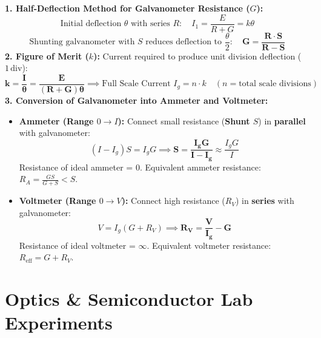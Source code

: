 \documentclass[10pt,a4paper]{article}
\begin{document}
\begin{formulabox}
\textbf{1. Half-Deflection Method for Galvanometer Resistance ($G$):}
\begin{equation}
  \text{Initial deflection } \theta \text{ with series } R: \quad I_1 = \frac{E}{R + G} = k\theta
\end{equation}
\begin{equation}
  \text{Shunting galvanometer with } S \text{ reduces deflection to } \frac{\theta}{2}: \quad \mathbf{G = \frac{R \cdot S}{R - S}}
\end{equation}
\textbf{2. Figure of Merit ($k$):} Current required to produce unit division deflection ($1\,\text{div}$):
\begin{equation}
  \mathbf{k = \frac{I}{\theta} = \frac{E}{(R + G)\theta}} \implies \text{Full Scale Current } I_g = n \cdot k \quad (n = \text{total scale divisions})
\end{equation}
\textbf{3. Conversion of Galvanometer into Ammeter and Voltmeter:}
\begin{itemize}
  \item \textbf{Ammeter (Range $0 \to I$):} Connect small resistance (\textbf{Shunt $S$}) in \textbf{parallel} with galvanometer:
  \begin{equation}
    (I - I_g)S = I_g G \implies \mathbf{S = \frac{I_g G}{I - I_g}} \approx \frac{I_g G}{I}
  \end{equation}
  Resistance of ideal ammeter = $0$. Equivalent ammeter resistance: $R_A = \frac{G S}{G + S} < S$.
  \item \textbf{Voltmeter (Range $0 \to V$):} Connect high resistance ($R_V$) in \textbf{series} with galvanometer:
  \begin{equation}
    V = I_g (G + R_V) \implies \mathbf{R_V = \frac{V}{I_g} - G}
  \end{equation}
  Resistance of ideal voltmeter = $\infty$. Equivalent voltmeter resistance: $R_{\text{eff}} = G + R_V$.
\end{itemize}
\end{formulabox}

\section{Optics \& Semiconductor Lab Experiments}
\end{document}

